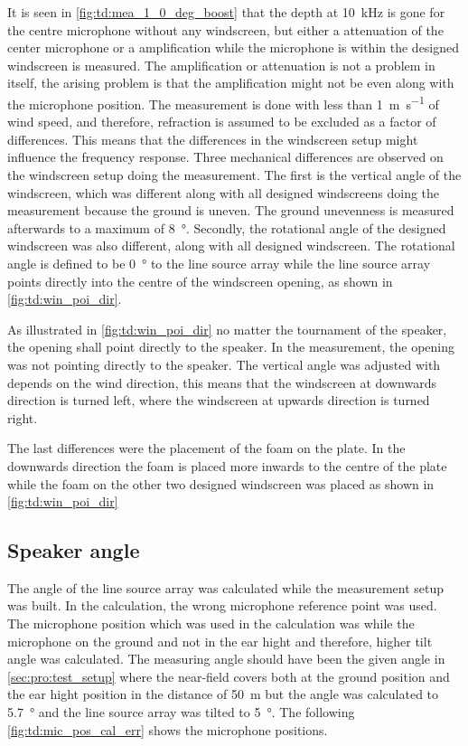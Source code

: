 It is seen in \autoref{fig:td:mea_1_0_deg_boost} that the depth at \SI{10}{\kilo\hertz} is gone for the centre microphone without any windscreen, but either a  attenuation of the center microphone or a  amplification while the microphone is within the designed windscreen is measured. The amplification or attenuation is not a problem in itself, the arising problem is that the amplification might not be even along with the microphone position. The measurement is done with less than \SI{1}{\meter\per\second} of wind speed, and therefore, refraction is assumed to be excluded as a factor of differences. This means that the differences in the windscreen setup might influence the frequency response. 
Three mechanical differences are observed on the windscreen setup doing the measurement. The first is the vertical angle of the windscreen, which was different along with all designed windscreens doing the measurement because the ground is uneven. The ground unevenness is measured afterwards to a maximum of \SI{8}{\degree}. Secondly, the rotational angle of the designed windscreen was also different, along with all designed windscreen. The rotational angle is defined to be \SI{0}{\degree} to the line source array while the line source array points directly into the centre of the windscreen opening, as shown in \autoref{fig:td:win_poi_dir}.


As illustrated in \autoref{fig:td:win_poi_dir} no matter the tournament of the speaker, the opening shall point directly to the speaker. In the measurement, the opening was not pointing directly to the speaker. The vertical angle was adjusted with depends on the wind direction, this means that the windscreen at downwards direction is turned left, where the windscreen at upwards direction is turned right. 

The last differences were the placement of the foam on the plate. In the downwards direction the foam is placed more inwards to the centre of the plate while the foam on the other two designed windscreen was placed as shown in \autoref{fig:td:win_poi_dir}


\subsection{Speaker angle}\label{sec:des:measuring_angle}
The angle of the line source array was calculated while the measurement setup was built. In the calculation, the wrong microphone reference point was used. The microphone position which was used in the calculation was while the microphone on the ground and not in the ear hight and therefore, higher tilt angle was calculated.  The measuring angle should have been the given angle in \autoref{sec:pro:test_setup} where the near-field covers both at the ground position and the ear hight position in the distance of \SI{50}{\meter} but the angle was calculated to \SI{5.7}{\degree} and the line source array was tilted to \SI{5}{\degree}. The following \autoref{fig:td:mic_pos_cal_err} shows the microphone positions.

